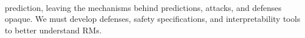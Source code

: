\documentclass[11pt,letterpaper]{article}
\begin{document}
\\
prediction, leaving the mechanisms behind predictions, attacks, and defenses opaque.
We must develop defenses, safety specifications, and interpretability tools to better understand RMs.

\end{document}
